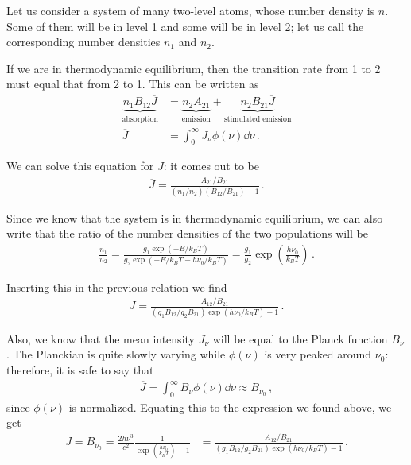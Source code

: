\documentclass[main.tex]{subfiles}
\begin{document}
Let us consider a system of many two-level atoms, whose number density is \(n\). Some of them will be in level 1 and some will be in level 2; let us call the corresponding number densities \(n_1 \) and \(n_2 \).

If we are in thermodynamic equilibrium, then the transition rate from 1 to 2 must equal that from 2 to 1. This can be written as 
%
\begin{align}
\underbrace{n_1 B_{12} \overline{J}}_{\text{absorption}} &= \underbrace{n_2 A_{21}}_{\text{emission}} + \underbrace{n_2 B_{21} \overline{J}}_{\text{stimulated emission}}  \\
\overline{J} &= \int_0^{\infty } J_\nu \phi (\nu ) \dd{\nu }
\,.
\end{align}

We can solve this equation for \(\overline{J}\): it comes out to be 
%
\begin{align}
\overline{J} = \frac{A_{21} / B_{21} }{ (n_1 / n_2 ) (B_{12} / B_{21} ) - 1}
\,.
\end{align}

Since we know that the system is in thermodynamic equilibrium, we can also write that the ratio of the number densities of the two populations will be 
%
\begin{align}
\frac{n_1}{n_2 } = \frac{g_1  \exp( - E / k_B T)}{g_2 \exp(- E / k_B T - h \nu_0 / k_B T)} = \frac{g_1}{g_2 } \exp( \frac{h \nu_0}{k_B T})
\,.
\end{align}

Inserting this in the previous relation we find 
%
\begin{align}
\overline{J} = \frac{A_{12} / B_{21} }{(g_1 B_{12} /  g_2 B_{21} ) \exp(h \nu_0 / k_B T) - 1 }
\,.
\end{align}

Also, we know that the mean intensity \(J_\nu \) will be equal to the Planck function \(B_\nu \). The Planckian is quite slowly varying while \(\phi (\nu )\) is very peaked around \(\nu_0 \): therefore, it is safe to say that 
%
\begin{align}
\overline{J} = \int_0^{\infty } B_\nu \phi (\nu ) \dd{\nu } \approx B_{\nu_0 }
\,,
\end{align}
%
since \(\phi (\nu )\) is normalized. Equating this to the expression we found above, we get 
%
\begin{align}
\overline{J} =  B_{\nu_0 } = \frac{2 h \nu^3}{c^2} \frac{1}{\exp( \frac{h \nu_0 }{k_B T }) - 1} &= \frac{A_{12} / B_{21} }{(g_1 B_{12} /  g_2 B_{21} ) \exp(h \nu_0 / k_B T) - 1 }
\,.
\end{align}
\end{document}
